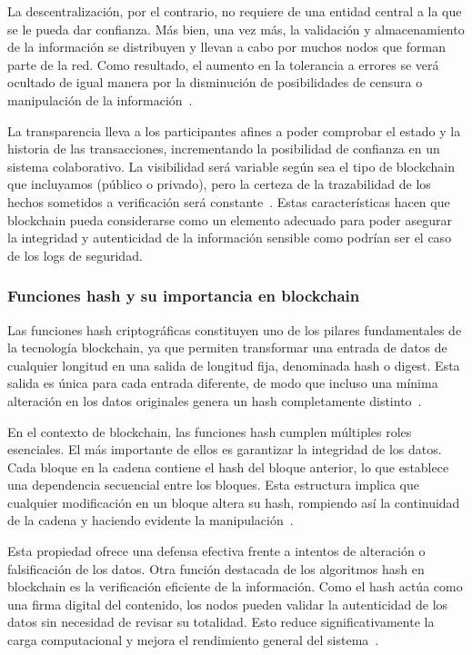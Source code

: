 La descentralización, por el contrario, no requiere de una entidad central a la que se le pueda dar confianza. Más bien, una vez más, la validación y almacenamiento de la información se distribuyen y llevan a cabo por muchos nodos que forman parte de la red. Como resultado, el aumento en la tolerancia a errores se verá ocultado de igual manera por la disminución de posibilidades de censura o manipulación de la información~\cite{nakamoto2008bitcoin}.

La transparencia lleva a los participantes afines a poder comprobar el estado y la historia de las transacciones, incrementando la posibilidad de confianza en un sistema colaborativo. La visibilidad será variable según sea el tipo de blockchain que incluyamos (público o privado), pero la certeza de la trazabilidad de los hechos sometidos a verificación será constante~\cite{Crosby2016}.
Estas características hacen que blockchain pueda considerarse como un elemento adecuado para poder asegurar la integridad y autenticidad de la información sensible como podrían ser el caso de los logs de seguridad.

\subsubsection{Funciones hash y su importancia en blockchain}
Las funciones hash criptográficas constituyen uno de los pilares fundamentales de la tecnología blockchain, ya que permiten transformar una entrada de datos de cualquier longitud en una salida de longitud fija, denominada hash o digest. Esta salida es única para cada entrada diferente, de modo que incluso una mínima alteración en los datos originales genera un hash completamente distinto~\cite{bishop2003computer}.

En el contexto de blockchain, las funciones hash cumplen múltiples roles esenciales. El más importante de ellos es garantizar la integridad de los datos. Cada bloque en la cadena contiene el hash del bloque anterior, lo que establece una dependencia secuencial entre los bloques. Esta estructura implica que cualquier modificación en un bloque altera su hash, rompiendo así la continuidad de la cadena y haciendo evidente la manipulación~\cite{axelsson2000ids}.

Esta propiedad ofrece una defensa efectiva frente a intentos de alteración o falsificación de los datos.
Otra función destacada de los algoritmos hash en blockchain es la verificación eficiente de la información. Como el hash actúa como una firma digital del contenido, los nodos pueden validar la autenticidad de los datos sin necesidad de revisar su totalidad. Esto reduce significativamente la carga computacional y mejora el rendimiento general del sistema~\cite{iso27001}.

